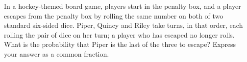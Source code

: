 In a hockey-themed board game, players start in the penalty box, and a player escapes from the penalty box by rolling the same number on both of two standard six-sided dice. Piper, Quincy and Riley take turns, in that order, each rolling the pair of dice on her turn; a player who has escaped no longer rolls. What is the probability that Piper is the last of the three to escape? Express your answer as a common fraction.
